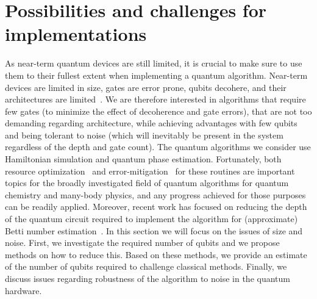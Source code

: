\documentclass[a4paper, onecolumn, accepted=2022-08-28]{quantumarticle}
\begin{document}
\section{Possibilities and challenges for implementations
\label{sec:nisq}}

As near-term quantum devices are still limited, it is crucial to make sure to use them to their fullest extent when implementing a quantum algorithm.
Near-term devices are limited in size, gates are error prone, qubits decohere, and their architectures are limited~\cite{preskill:nisq}.
We are therefore interested in algorithms that require few gates (to minimize the effect of decoherence and gate errors), that are not too demanding regarding architecture, while achieving advantages with few qubits and being tolerant to noise (which will inevitably be present in the system regardless of the depth and gate count). 
The quantum algorithms we consider use Hamiltonian simulation and quantum phase estimation.
Fortunately, both resource optimization~\cite{bauer:quantum_simulation} and error-mitigation~\cite{temme:error, bonet:error, endo:error, mcardle:error, tom:error} for these routines are important topics for the broadly investigated field of quantum algorithms for quantum chemistry and many-body physics, and any progress achieved for those purposes can be readily applied.
Moreover, recent work has focused on reducing the depth of the quantum circuit required to implement the algorithm for (approximate) Betti number estimation~\cite{ubaru:qtda}.
In this section we will focus on the issues of size and noise.
First, we investigate the required number of qubits and we propose methods on how to reduce this.
Based on these methods, we provide an estimate of the number of qubits required to challenge classical methods.
Finally, we discuss issues regarding robustness of the algorithm to noise in the quantum hardware.
\end{document}
